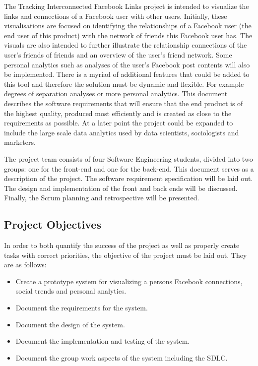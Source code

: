 \documentclass[12pt,onecolumn]{article}
\begin{document}
	The Tracking Interconnected Facebook Links project is intended to visualize the links and connections of a Facebook user with other users. Initially, these visualisations are focused on identifying the relationships of a Facebook user (the end user of this product) with the network of friends this Facebook user has. The visuals are also intended to further illustrate the relationship connections of the user's friends of friends and an overview of the user's friend network. Some personal analytics such as analyses of the user's Facebook post contents will also be implemented. There is a myriad of additional features that could be added to this tool and therefore the solution must be dynamic and flexible. For example degrees of separation analyses or more personal analytics. This document describes the software requirements that will ensure that the end product is of the highest quality, produced most efficiently and is created as close to the requirements as possible. At a later point the project could be expanded to include the large scale data analytics used by data scientists, sociologists and marketers. 
	
	The project team consists of four Software Engineering students, divided into two groups: one for the front-end and one for the back-end. This document serves as a description of the project. The software requirement specification will be laid out. The design and implementation of the front and back ends will be discussed. Finally, the Scrum planning and retrospective will be presented.
	
	\subsection{Project Objectives} %
	
	In order to both quantify the success of the project as well as properly create tasks with correct priorities, the objective of the project must be laid out. They are as follows:
	
	\begin{itemize}
		
		\item Create a prototype system for visualizing a persons Facebook connections, social trends and personal analytics.
		
		\item Document the requirements for the system.
		
		\item Document the design of the system.
		
		\item Document the implementation and testing of the system.
		
		\item Document the group work aspects of the system including the SDLC.
		
	\end{itemize}
	
\end{document}
